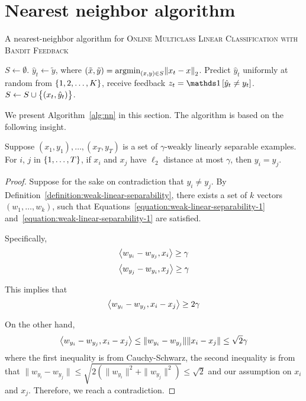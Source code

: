 \section{Nearest neighbor algorithm}
\label{section:nearest-neighbor-algorithm}

\begin{algorithm}
\caption{A nearest-neighbor algorithm for \textsc{Online Multiclass Linear Classification with
Bandit Feedback}}
\begin{algorithmic}[1]
\STATE $S \gets \emptyset$.
	\STATE $\hat{y}_t \gets \tilde{y}$, where $(\tilde{x}, \tilde{y}) = \operatorname*{argmin}_{(x,y) \in S} \norm{x_t - x}_2$.
\ELSE
	\STATE Predict $\hat{y}_t$ uniformly at random from $\cbr{1,2,\dots,K}$, receive feedback $z_t = \indicator{\hat{y}_t \neq y_t}$.
  \label{line:nn-explore}
    \STATE $S \gets S \cup \cbr{(x_t, \hat{y}_t)}$.
  \ENDIF
\ENDIF
\ENDFOR
\end{algorithmic}
\label{alg:nn}
\end{algorithm}

We present Algorithm~\ref{alg:nn} in this section. The algorithm is based on the
following insight.

\begin{lemma}
Suppose $(x_1,y_1), \ldots, (x_T, y_T)$ is a set of $\gamma$-weakly linearly
separable examples. For $i$, $j$ in $\cbr{1,\ldots,T}$, if $x_i$ and $x_j$ have
$\ell_2$ distance at most $\gamma$, then $y_i = y_j$. \label{lem:nn}
\end{lemma}

\begin{proof}
Suppose for the sake on contradiction that $y_i \neq y_j$. By
Definition~\ref{definition:weak-linear-separability}, there exists a set of $k$
vectors $(w_1, \ldots, w_k)$, such that
Equations~\eqref{equation:weak-linear-separability-1}
and~\eqref{equation:weak-linear-separability-1} are satisfied.

Specifically,
\[ \left\langle w_{y_i} - w_{y_j}, x_i \right\rangle \geq \gamma \]
\[ \left\langle w_{y_j} - w_{y_i}, x_j \right\rangle \geq \gamma \]

This implies that
\[ \left\langle w_{y_i} - w_{y_j}, x_i - x_j \right\rangle \geq 2\gamma \]

On the other hand,
\[ \left\langle w_{y_i} - w_{y_j}, x_i - x_j \right\rangle \leq \| w_{y_i} - w_{y_j} \| \| x_i - x_j \| \leq \sqrt{2} \gamma \]
where the first inequality is from Cauchy-Schwarz,
the second inequality is from that
$\|w_{y_i} - w_{y_j}\| \leq \sqrt{2(\|w_{y_i}\|^2 + \|w_{y_j}\|^2)} \leq \sqrt{2}$ and our assumption
on $x_i$ and $x_j$. Therefore, we reach a contradiction.
\end{proof}


